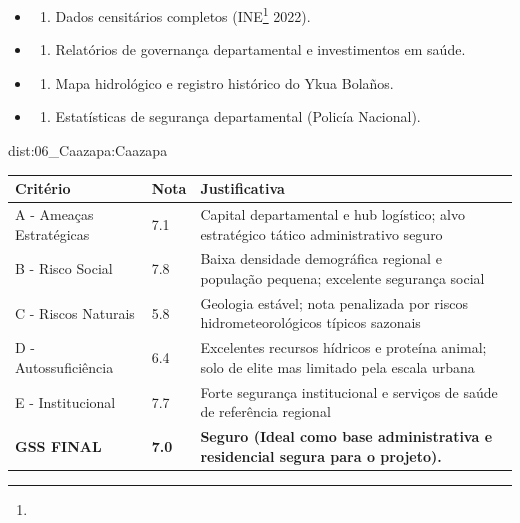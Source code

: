 {\begin{itemize}
\tightlist
\item
  \begin{enumerate}
  \def\labelenumi{\arabic{enumi})}
  \tightlist
  \item
    Dados censitários completos (INE\footnote{\fineINE} 2022).
  \end{enumerate}
\item
  \begin{enumerate}
  \def\labelenumi{\arabic{enumi})}
  \setcounter{enumi}{1}
  \tightlist
  \item
    Relatórios de governança departamental e investimentos em saúde.
  \end{enumerate}
\item
  \begin{enumerate}
  \def\labelenumi{\arabic{enumi})}
  \setcounter{enumi}{2}
  \tightlist
  \item
    Mapa hidrológico e registro histórico do Ykua Bolaños.
  \end{enumerate}
\item
  \begin{enumerate}
  \def\labelenumi{\arabic{enumi})}
  \setcounter{enumi}{3}
  \tightlist
  \item
    Estatísticas de segurança departamental (Policía Nacional).
  \end{enumerate}
\end{itemize}}{dist:06_Caazapa:Caazapa}
\begin{table}[ht!]
\small \begin{tabular}{p{3.0cm}p{0.8cm}p{6.0cm}} \toprule
\textbf{Critério} & \textbf{Nota} & \textbf{Justificativa} \\ \midrule
A - Ameaças Estratégicas & 7.1 & Capital departamental e hub logístico; alvo estratégico tático administrativo seguro \\
B - Risco Social & 7.8 & Baixa densidade demográfica regional e população pequena; excelente segurança social \\
C - Riscos Naturais & 5.8 & Geologia estável; nota penalizada por riscos hidrometeorológicos típicos sazonais \\
D - Autossuficiência & 6.4 & Excelentes recursos hídricos e proteína animal; solo de elite mas limitado pela escala urbana \\
E - Institucional & 7.7 & Forte segurança institucional e serviços de saúde de referência regional \\
\midrule \textbf{GSS FINAL} & \textbf{7.0} & \textbf{Seguro (Ideal como base administrativa e residencial segura para o projeto).} \\ \bottomrule \end{tabular}
\end{table}
